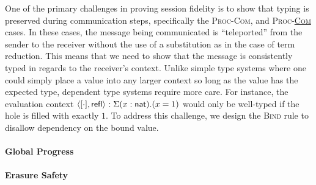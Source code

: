 One of the primary challenges in proving session fidelity is to show that typing
is preserved during communication steps, specifically the \textsc{Proc-Com}, and
\textsc{Proc-\underline{Com}} cases. In these cases, the message being
communicated is ``teleported'' from the sender to the receiver without the use
of a substitution as in the case of term reduction. This means that we need to
show that the message is consistently typed in regards to the receiver's
context.  Unlike simple type systems where one could simply place a value into
any larger context so long as the value has the expected type, dependent type
systems require more care.  For instance, the evaluation context
$\langle{{[\cdot]},{\textsf{refl}}}\rangle_{} : \Sigma(x : \textsf{nat}).(x = 1)$  would only be
well-typed if the hole is filled with exactly $1$. To address this challenge, 
we design the \textsc{Bind} rule to disallow dependency on the bound value.


\paragraph{\textbf{Global Progress}}
\paragraph{\textbf{Erasure Safety}}
